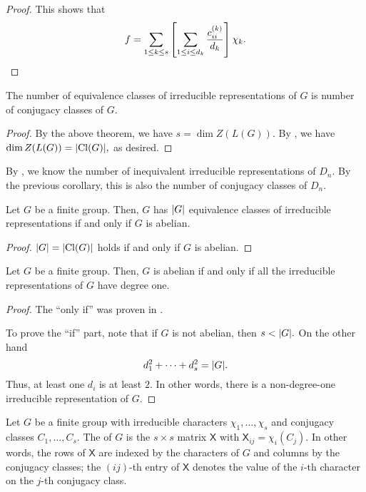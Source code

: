 \begin{proof}
	This shows that
	\begin{equation*} 
		f = \sum_{1 \le k \le s} \left[\sum_{1 \le i \le d_k}\frac{c_{ii}^{(k)}}{d_k}\right]\chi_k. \qedhere
	\end{equation*}
\end{proof}

\begin{cor} \label{cor:numirredrepsconjclass}
	The number of equivalence classes of irreducible representations of $G$ is number of conjugacy classes of $G.$
\end{cor}
\begin{proof} 
	By the above theorem, we have $s = \dim Z(L(G)).$ By , we have $\dim Z(L(G)) = {\left\lvert \operatorname{Cl}(G) \right\lvert},$ as desired.
\end{proof}

\begin{ex}
	By , we know the number of inequivalent irreducible representations of $D_n.$ By the previous corollary, this is also the number of conjugacy classes of $D_n.$
\end{ex}

\begin{cor} \label{cor:numberofirredrepsofG}
	Let $G$ be a finite group. Then, $G$ has ${\left\lvert G \right\lvert}$ equivalence classes of irreducible representations if and only if $G$ is abelian.
\end{cor}
\begin{proof} 
	${\left\lvert G \right\lvert} = {\left\lvert \operatorname{Cl}(G) \right\lvert}$ holds if and only if $G$ is abelian.
\end{proof}

\begin{cor}
	Let $G$ be a finite group. Then, $G$ is abelian if and only if all the irreducible representations of $G$ have degree one.
\end{cor}
\begin{proof} 
	The ``only if'' was proven in .

	To prove the ``if'' part, note that if $G$ is not abelian, then $s < {\left\lvert G \right\lvert}.$ On the other hand
	\begin{equation*} 
		d_1^2 + \cdots + d_s^2 = {\left\lvert G \right\lvert}.
	\end{equation*}
	Thus, at least one $d_i$ is at least $2.$ In other words, there is a non-degree-one irreducible representation of $G.$
\end{proof}

\begin{defn}%
	\label{defn:charactertable}
	Let $G$ be a finite group with irreducible characters $\chi_1, \ldots, \chi_s$ and conjugacy classes $C_1, \ldots, C_s.$ The  of $G$ is the $s \times s$ matrix $\mathsf{X}$ with $\mathsf{X}_{ij} = \chi_i(C_j).$ In other words, the rows of $\mathsf{X}$ are indexed by the characters of $G$ and columns by the conjugacy classes; the $(ij)$-th entry of $\mathsf{X}$ denotes the value of the $i$-th character on the $j$-th conjugacy class.
\end{defn}

